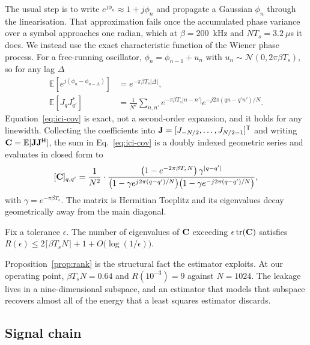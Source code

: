The usual step is to write $e^{j\phi_n} \approx 1 + j \phi_n$ and propagate a
Gaussian $\phi_n$ through the linearisation. That approximation fails once the
accumulated phase variance over a symbol approaches one radian, which at
$\beta = 200$~kHz and $N T_s = 3.2~\mu$s it does. We instead use the exact
characteristic function of the Wiener phase process. For a free-running
oscillator, $\phi_n = \phi_{n-1} + u_n$ with
$u_n \sim \mathcal{N}(0, 2\pi \beta T_s)$, so for any lag $\Delta$
\begin{align}
  \label{eq:charfun}
  \mathbb{E}\!\left[ e^{j(\phi_n - \phi_{n-\Delta})} \right]
    &= e^{-\pi \beta T_s |\Delta|} , \\
  \label{eq:ici-cov}
  \mathbb{E}\!\left[ J_q J_{q'}^{*} \right]
    &= \frac{1}{N^2} \sum_{n,n'} e^{-\pi \beta T_s |n - n'|}
       e^{-j 2\pi (qn - q'n')/N} .
\end{align}
Equation~\eqref{eq:ici-cov} is exact, not a second-order expansion, and it
holds for any linewidth. Collecting the coefficients into
$\mathbf{J} = [J_{-N/2}, \dots, J_{N/2-1}]^{\mathsf{T}}$ and writing
$\mathbf{C} = \mathbb{E}[\mathbf{J} \mathbf{J}^{\mathsf{H}}]$, the sum in
Eq.~\eqref{eq:ici-cov} is a doubly indexed geometric series and evaluates in
closed form to
\begin{equation}
  \label{eq:cov-closed}
  [\mathbf{C}]_{q,q'} =
  \frac{1}{N^2} \cdot
  \frac{\bigl(1 - e^{-2\pi\beta T_s N}\bigr) \, \gamma^{|q-q'|}}
       {\bigl(1 - \gamma e^{j 2\pi (q-q')/N}\bigr)
        \bigl(1 - \gamma e^{-j 2\pi (q-q')/N}\bigr)} ,
\end{equation}
with $\gamma = e^{-\pi \beta T_s}$. The matrix is Hermitian Toeplitz and its
eigenvalues decay geometrically away from the main diagonal.

\begin{proposition}
\label{prop:rank}
Fix a tolerance $\epsilon$. The number of eigenvalues of $\mathbf{C}$ exceeding
$\epsilon \operatorname{tr}(\mathbf{C})$ satisfies
$R(\epsilon) \le 2 \lceil \beta T_s N \rceil + 1 +
 O\!\bigl(\log(1/\epsilon)\bigr)$.
\end{proposition}

Proposition~\ref{prop:rank} is the structural fact the estimator exploits. At
our operating point, $\beta T_s N = 0.64$ and $R(10^{-3}) = 9$ against
$N = 1024$. The leakage lives in a nine-dimensional subspace, and an estimator
that models that subspace recovers almost all of the energy that a least
squares estimator discards.

\subsection{Signal chain}

